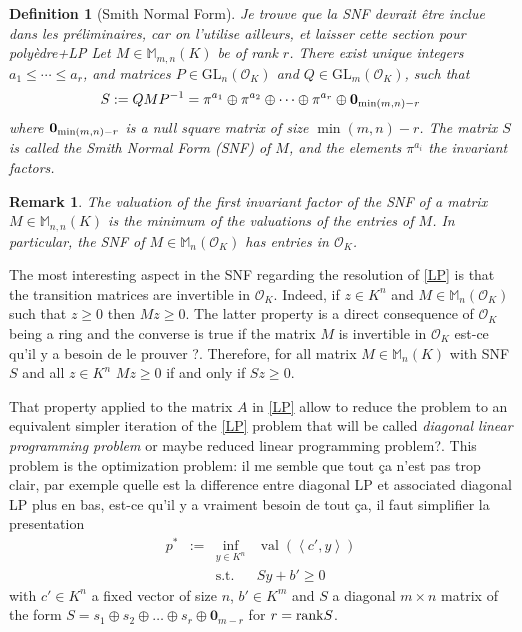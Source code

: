 \documentclass[a4paper,12pt]{article}
\newtheorem{definition}{Definition}
\newtheorem{remark}{Remark}
\newcommand{\allmat}{\mathbb{M}} %
\newcommand{\simone}[1]{{\color{blue} #1}} %
\newcommand{\corentin}[1]{{\color{red} #1}} %
\DeclareMathOperator{\val}{val}
\newcommand{\OK}{\mathcal{O}_K}
\newcommand{\GL}{\mathrm{GL}}
\begin{document}
\begin{definition}[Smith Normal Form]\label{smith_nf} \simone{Je trouve que la SNF devrait être inclue dans les
  préliminaires, car on l'utilise ailleurs, et laisser cette section pour polyèdre+LP}
  Let $M \in \allmat_{m,n}(K)$ be of rank $r$. There exist unique integers $a_1 \leq \cdots \leq a_r$, and
  matrices $P \in \GL_n(\OK)$ and $Q \in \GL_m(\OK)$, such that
  $$
  S := QMP^{-1} = \pi^{a_1} \oplus \pi^{a_2} \oplus \cdots \oplus \pi^{a_r} \oplus {\bf 0}_{\min(m,n)-r}
  $$
  where ${\bf 0}_{\min(m,n)-r}$ is a null square matrix of size $\min(m,n)-r$.
  The matrix $S$ is called the \emph{Smith Normal Form (SNF)} of $M$, and the elements $\pi^{a_i}$ the
  \emph{invariant factors}.
\end{definition}
\begin{remark}
  The valuation of the first invariant factor of the SNF of a matrix
  $M \in \allmat_{n,n}(K)$ is the minimum of the valuations of the entries of
  $M$. In particular, the SNF of $M \in \allmat_n(\OK)$ has entries in $\OK$.
\end{remark}

The most interesting aspect in the SNF regarding the resolution of \ref{LP} is that the transition matrices are invertible in $\OK$. Indeed, if $z \in K^n$ and $M \in \allmat_n(\OK)$ such that $z \geq 0$ then $Mz \geq 0$. The latter property is a direct consequence of $\OK$ being a ring and the converse is true if the matrix $M$ is invertible in $\OK$ \corentin{est-ce qu'il y a besoin de le prouver ?}. Therefore, for all matrix $M \in \allmat_n(K)$ with SNF $S$ and all $z \in K^n$ $Mz \geq 0$ if and only if $Sz \geq 0$. 

That property applied to the matrix $A$ in \ref{LP} allow to reduce the problem to an equivalent simpler iteration of the \ref{LP} problem that will be called \emph{diagonal linear programming problem} \corentin{or maybe reduced linear programming problem?}. This problem is the optimization problem: \simone{il me semble que tout ça n'est pas trop clair, par exemple quelle est la difference entre diagonal LP et associated diagonal LP plus en bas, est-ce qu'il y a vraiment besoin de tout ça, il faut simplifier la presentation}
\begin{equation}
  \tag{dLP}\label{dLP}
\begin{array}{rcll}
  p^* & := & \inf_{y \in K^n} & \val(\left\langle c', y \right\rangle) \\
  &    & \text{s.t.}         & S y + b' \geq 0
\end{array}
\end{equation}
with $c' \in K^n$ a fixed vector of size $n$, $b' \in K^m$ and $S$ a diagonal $m \times n$ matrix of the form $S = s_1 \oplus s_2 \oplus \ldots \oplus s_r \oplus { \bm 0}_{m-r} $ for $r={\rm rank} S$.
\end{document}
